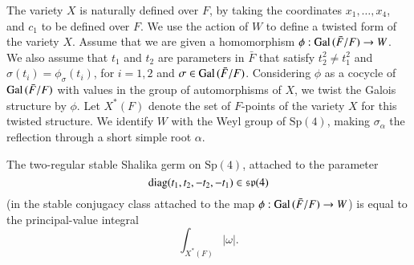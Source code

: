 \documentclass{amsart}
\newcommand\Gal{\hbox{Gal\,}}
\newcommand\diag{\hbox{diag}}
\newcommand\fsp{{\mathfrak s\mathfrak p}}
\newcommand\bF{{\bar F}}
\newenvironment{cthm}[1]
  {\renewcommand\thethm{\bf #1}\thm}
  {\endthm}
\begin{document}
The variety $X$ 
is naturally defined over $F$, by taking the coordinates
$x_1,\ldots,x_4$, and $c_1$ to be defined over $F$.  
We use the action of $W$ to define a twisted form of the variety $X$.
Assume that we are given
a homomorphism $\phi:\Gal(\bF/F)\to W$.  We also assume that
$t_1$ and $t_2$ are parameters in $\bF$ that satisfy
$t_2^2\ne t_1^2$ and
$\sigma(t_i) = \phi_\sigma(t_i)$, for $i=1,2$ and $\sigma\in \Gal(\bF/F)$.
Considering $\phi$ as a cocycle of $\Gal(\bF/F)$ with values in
the group of automorphisms of $X$, we twist
the Galois structure by $\phi$.
Let
$X^*(F)$ denote the set of $F$-points of the variety $X$ for this
twisted structure.
We identify $W$ with the Weyl group of $\text{Sp}(4)$, making $\sigma_\alpha$ the
reflection through a short simple root $\alpha$.
\bigskip

\noindent
\begin{cthm}{Lemma 3.1}
The two-regular stable Shalika germ on
$\text{Sp}(4)$, attached to the parameter
$$\diag(t_1,t_2,-t_2,-t_1) \in \fsp(4)$$ (in the stable conjugacy class
attached to the map $\phi:\Gal(\bF/F)\to W$) is equal to the
principal-value integral
$$\int_{X^*(F)} |\omega|.$$
\end{cthm}
\end{document}
